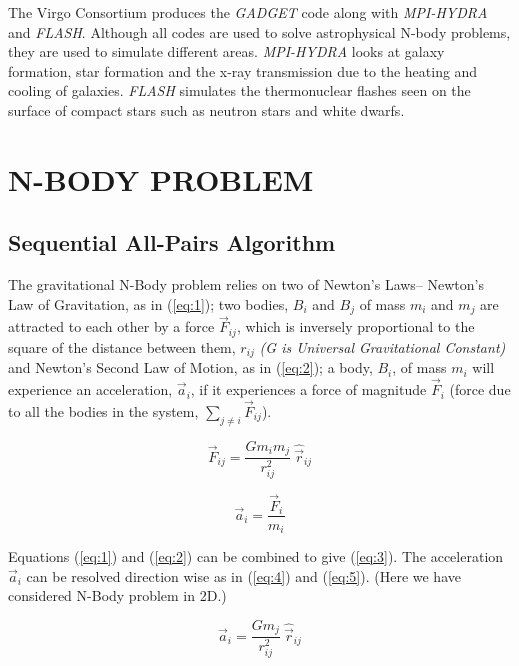 \documentclass[letterpaper, 10 pt, conference]{ieeeconf}
\begin{document}
    The Virgo Consortium produces the \textit{GADGET} code along with \textit{MPI-HYDRA} and \textit{FLASH}. Although all codes are used to solve astrophysical N-body problems, they are used to simulate different areas. \textit{MPI-HYDRA} looks at galaxy formation, star formation and the x-ray transmission due to the heating and cooling of galaxies. \textit{FLASH} simulates the thermonuclear flashes seen on the surface of compact stars such as neutron stars and white dwarfs.


    \section{N-BODY PROBLEM}

    \subsection{Sequential All-Pairs Algorithm}

    The gravitational N-Body problem relies on two of Newton's Laws{--} Newton's Law of Gravitation, as in (\ref{eq:1}); two bodies, $B_i$ and $B_j$ of mass $m_i$ and $m_j$ are attracted to each other by a force $\vec{F}_{ij}$, which is inversely proportional to the square of the distance between them, $r_{ij}$ \textit{(G is Universal Gravitational Constant)} and Newton's Second Law of Motion, as in (\ref{eq:2}); a body, $B_i$, of mass $m_i$ will experience an acceleration, $\vec{a}_i$, if it experiences a force of magnitude $\vec{F}_i$ (force due to all the bodies in the system, \(\sum_{j \neq i}\vec{F}_{ij}\)).

    \begin{equation}
        \label{eq:1}
        \vec{F}_{ij} = \frac{Gm_im_j}{r_{ij}^2} \: \hat{\vec{r}}_{ij}
    \end{equation}

    \begin{equation}
        \label{eq:2}
        \vec{a}_i = \frac{\vec{F}_i}{m_i}
    \end{equation}

    Equations (\ref{eq:1}) and (\ref{eq:2}) can be combined to give (\ref{eq:3}). The acceleration $\vec{a}_i$ can be resolved direction wise as in (\ref{eq:4}) and (\ref{eq:5}). (Here we have considered N-Body problem in 2D.)

    \begin{equation}
        \label{eq:3}
        \vec{a}_i = \frac{Gm_j}{r_{ij}^2} \:
        \hat{\vec{r}}_{ij}
    \end{equation}
\end{document}
